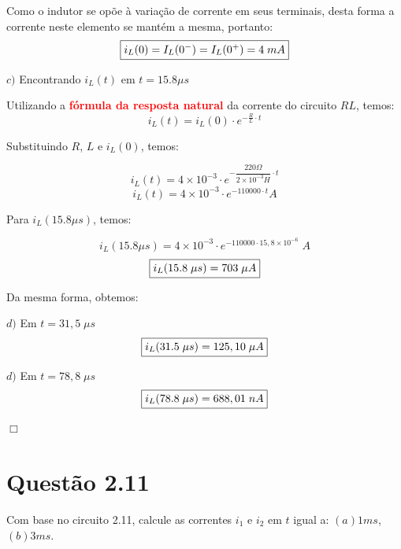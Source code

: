 \documentclass[
	12pt,				%
	oneside,			%
	a4paper,			%
	english,			%
	french,				%
	spanish,			%
	brazil				%
	]{abntex2}
\begin{document}
Como o indutor se opõe à variação de corrente em seus terminais, desta forma a corrente neste elemento se mantém a mesma, portanto:
\begin{equation}
    \centering
    \fbox{$i_L(0) = I_L(0^-) = I_L(0^+) = 4\;mA$}    
\end{equation}
\newpage

$c)$ Encontrando $i_L(t)$ em $t=15.8\mu s$

Utilizando a \textbf{\textcolor{red}{fórmula da resposta natural}} da corrente do circuito $RL$, temos:
$$i_L(t) = i_L(0) \cdot e^{-\frac{R}{L} \cdot t}$$

Substituindo $R$, $L$ e $i_L(0)$, temos:

$$i_L(t) = 4 \times 10^{-3} \cdot e^{-\dfrac{220\Omega}{2 \times 10^{-3}H} \cdot t}$$
$$i_L(t) = 4 \times 10^{-3} \cdot e^{-110000 \cdot t} A$$

Para $i_L(15.8\mu s)$, temos:

$$i_L(15.8\mu s) = 4 \times 10^{-3} \cdot e^{-110000 \cdot 15,8 \times 10^{-6}}\;A$$
\begin{equation}
    \centering
    \fbox{$i_L(15.8\;\mu s) = 703\;\mu A$}   
\end{equation}

Da mesma forma, obtemos:

$d)$ Em $t=31,5\;\mu s$
\begin{equation}
    \centering
    \fbox{$i_L(31.5\;\mu s) = 125,10\;\mu A$}   
\end{equation}

$d)$ Em $t=78,8\;\mu s$
\begin{equation}
    \centering
    \fbox{$i_L(78.8\;\mu s) = 688,01\;nA$}  
\end{equation}

\begin{flushright}
    $\Box$
\end{flushright}
\newpage

\section*{Questão 2.11}
Com base no circuito 2.11, calcule as correntes $i_{1}$ e $i_{2}$ em $t$ igual a: $(a) 1 ms$, $(b) 3 ms$.
\end{document}
